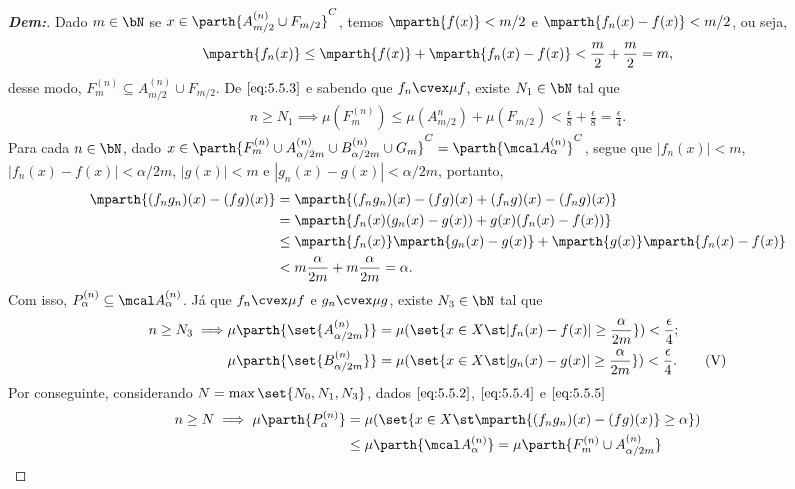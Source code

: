 \begin{proof}[\textbf{Dem:}]
  Dado $m \in \bN$ se $x \in \parth{A_{m/2}^{(n)} \cup F_{m/2}}^C$,
  temos $\mparth{f(x)} < m/2$ 
  e $\mparth{f_n(x) - f(x)}<m/2$, ou seja,
  \begin{align*}
    \mparth{f_n(x)} \le \mparth{f(x)} + \mparth{f_n(x) - f(x)} < \frac m 2 + \frac m 2 = m,
  \end{align*}
  desse modo, $F_{m}^{(n)} \subseteq A_{m/2}^{(n)} \cup F_{m/2}$.  
  De $\eqref{eq:5.5.3}$ e sabendo que $f_n \cvex \mu f$, existe $N_1 \in \bN$ 
  tal que
  \begin{align*}
    n\ge N_1 \implies \mu(F_{m}^{(n)}) \le \mu(A^{n}_{m/2}) + \mu(F_{m/2})
    < \frac{\epsilon}{8} +\frac{\epsilon}{8} = \frac{\epsilon} 4.
    \tag{IV}
    \label{eq:5.5.4}
  \end{align*}
  Para cada $n \in \bN$, dado $x \in \parth{F_{m}^{(n)} \cup A_{\alpha/2m}^{(n)} 
  \cup B_{\alpha/2m}^{(n)} \cup G_m }^C = \parth{\mcal A_{\alpha}^{(n)}}^C$,
  segue que $|f_n(x)|<m$, 
  $|f_n(x) - f(x)| < \alpha/2m$, $|g(x)| < m$ e $|g_n(x) - g(x)| < \alpha/2m$, 
  portanto,
\begin{align*}
  \mparth{(f_ng_n)(x) - (fg)(x)} &= \mparth{(f_ng_n)(x) - (fg)(x) +(f_ng)(x) - (f_ng)(x)}\\ 
  &=\mparth{f_n(x)(g_n(x) - g(x)) + g(x)(f_n(x) -f(x))}\\
  &\le\mparth{f_n(x)}\mparth{g_n(x) - g(x)} + \mparth{g(x)}
  \mparth{f_n(x) - f(x)} \\
  &< m\frac \alpha {2m} 
  + m \frac \alpha {2m} = \alpha.
\end{align*}
Com isso, $P_{\alpha}^{(n)} \subseteq \mcal A_{\alpha}^{(n)}$. 
Já que $f_n \cvex \mu f$ e $g_n \cvex \mu g$, existe $N_3 \in \bN$ tal que 
\begin{align*}
  n\ge N_3 \implies &\mu\parth{\set{A^{(n)}_{\alpha/2m}}}
  = \mu(\set{x \in X \st |f_n(x) - f(x)|\ge\frac{\alpha}{2m}}) < \frac{\epsilon}{4};\\
  &\mu\parth{\set{B^{(n)}_{\alpha/2m}}}
  = \mu(\set{x \in X \st |g_n(x) - g(x)|\ge\frac{\alpha}{2m}}) < \frac{\epsilon}{4}.
  \tag{V}
  \label{eq:5.5.5}
\end{align*}
Por conseguinte,
considerando $N = \max\set{N_0, N_1, N_3}$, dados $\eqref{eq:5.5.2}$, $\eqref{eq:5.5.4}$ 
e $\eqref{eq:5.5.5}$
\begin{align*}
  n \ge N \implies \mu\parth{P_{\alpha}^{(n)}} &= \mu(\set{x \in X \st 
  \mparth{(f_ng_n)(x) - (fg)(x)}\ge \alpha})\\
  &\le \mu\parth{\mcal A_{\alpha}^{(n)}} = \mu\parth{F_{m}^{(n)} \cup A_{\alpha/2m}^{(n)} 
}
\end{align*}
\end{proof}

